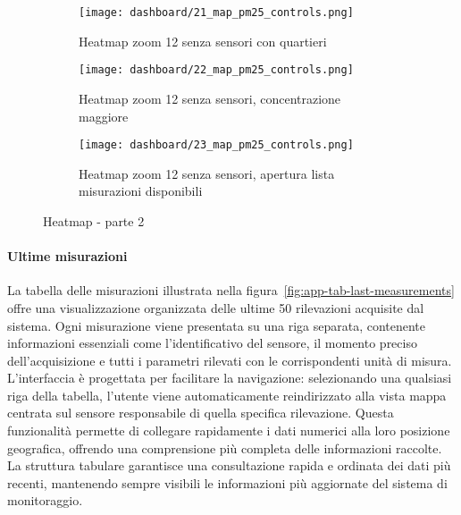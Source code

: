 \begin{figure}[H]
  \centering

  \begin{subfigure}{0.48\textwidth}
    \centering
    \texttt{[image: dashboard/21\_map\_pm25\_controls.png]}
    \caption{Heatmap zoom 12 senza sensori con quartieri}
    \label{fig:app-map-pm25-controls-21}
  \end{subfigure}
  \hfill
  \begin{subfigure}{0.48\textwidth}
    \centering
    \texttt{[image: dashboard/22\_map\_pm25\_controls.png]}
    \caption{Heatmap zoom 12 senza sensori, concentrazione maggiore}
    \label{fig:app-map-pm25-controls-22}
  \end{subfigure}

  \vspace{1em}

  \begin{subfigure}{0.48\textwidth}
    \centering
    \texttt{[image: dashboard/23\_map\_pm25\_controls.png]}
    \caption{Heatmap zoom 12 senza sensori, apertura lista misurazioni disponibili}
    \label{fig:app-map-pm25-controls-23}
  \end{subfigure}

  \caption{Heatmap - parte 2}
  \label{fig:app-map-heatmap-2}
\end{figure}

\newpage

\paragraph{Ultime misurazioni}

La tabella delle misurazioni illustrata nella figura~\ref{fig:app-tab-last-measurements} offre una visualizzazione
organizzata delle ultime 50 rilevazioni acquisite dal sistema. Ogni misurazione viene presentata su una riga separata,
contenente informazioni essenziali come l'identificativo del sensore, il momento preciso dell'acquisizione e tutti
i parametri rilevati con le corrispondenti unità di misura.
L'interfaccia è progettata per facilitare la navigazione: selezionando una qualsiasi riga della tabella,
l'utente viene automaticamente reindirizzato alla vista mappa centrata sul sensore responsabile
di quella specifica rilevazione. Questa funzionalità permette di collegare rapidamente i dati numerici alla
loro posizione geografica, offrendo una comprensione più completa delle informazioni raccolte.
La struttura tabulare garantisce una consultazione rapida e ordinata dei dati più recenti,
mantenendo sempre visibili le informazioni più aggiornate del sistema di monitoraggio.

